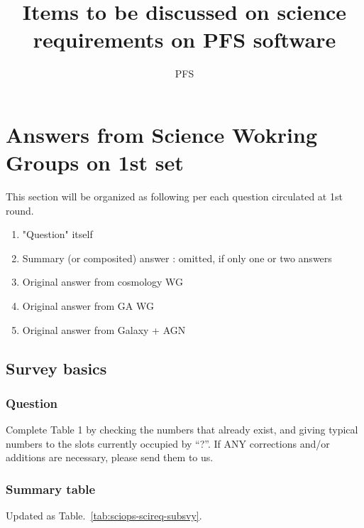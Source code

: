 \documentclass[a4paper,notitlepage]{article}
\title{Items to be discussed on science requirements on PFS software}
\author{PFS}
\begin{document}

\ssnhead

\section{Answers from Science Wokring Groups on 1st set}

This section will be organized as following per each question circulated 
at 1st round. 
\begin{enumerate}
  \item "Question" itself
  \item Summary (or composited) answer : omitted, if only one or two answers
  \item Original answer from cosmology WG
  \item Original answer from GA WG
  \item Original answer from Galaxy + AGN
\end{enumerate}

\renewcommand{\thesubsection}{Q.1.0-\alph{subsection}}
\setcounter{subsection}{0}
\subsection{Survey basics}

\subsubsection{Question}

Complete Table 1 by checking the numbers that already exist,
and giving typical numbers to the slots currently occupied by
``?''. If ANY corrections and/or additions are necessary, please send
them to us.

\subsubsection{Summary table}

Updated as Table.~\ref{tab:sciops-scireq-subsvy}.
\end{document}

